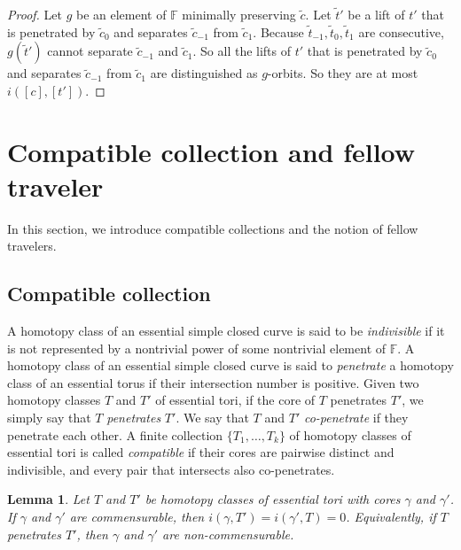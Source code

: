 \documentclass[12pt,a4paper]{amsart}
\numberwithin{equation}{section}
\newcommand{\FF}{\mathbb{F}}
\theoremstyle{plain}
\newtheorem{lemma}[theorem]{Lemma}
\theoremstyle{definition}
\theoremstyle{remark}
\begin{document}
\begin{proof}
    Let $g$ be an element of $\FF$ minimally preserving $\tilde{c}$.
    Let $\tilde{t}'$ be a lift of $t'$ that is penetrated by $\tilde{c}_0$ and separates $\tilde{c}_{-1}$ from $\tilde{c}_1$.
    Because $\tilde{t}_{-1}, \tilde{t}_0, \tilde{t}_1$ are consecutive, $g(\tilde{t}')$ cannot separate $\tilde{c}_{-1}$ and $\tilde{c}_1$.
    So all the lifts of $t'$ that is penetrated by $\tilde{c}_0$ and separates $\tilde{c}_{-1}$ from $\tilde{c}_1$ are distinguished as $g$-orbits.
    So they are at most $i([c], [t'])$.
\end{proof}







\section{Compatible collection and fellow traveler}





In this section, we introduce compatible collections and the notion of fellow travelers.  

\subsection{Compatible collection}

A homotopy class of an essential simple closed curve is said to be \emph{indivisible} if it is not represented by a nontrivial power of some nontrivial element of $\FF$.
A homotopy class of an essential simple closed curve is said to \emph{penetrate} a homotopy class of an essential torus if their intersection number is positive.
Given two homotopy classes \(T\) and \(T'\) of essential tori, if the core of \(T\) penetrates \(T'\), we simply say that \(T\) \emph{penetrates} \(T'\).
We say that \(T\) and \(T'\) \emph{co-penetrate} if they penetrate each other.
A finite collection \(\{T_1, \dots, T_k\}\) of homotopy classes of essential tori is called \emph{compatible} if their cores are pairwise distinct and indivisible, and every pair that intersects also co-penetrates.

\begin{lemma} \label{lem:penetration_noncomm}
    Let $T$ and $T'$ be homotopy classes of essential tori with cores $\gamma$ and $\gamma'$.
    If $\gamma$ and $\gamma'$ are commensurable, then $i(\gamma, T') = i(\gamma', T) = 0$.
    Equivalently, if $T$ penetrates $T'$, then $\gamma$ and $\gamma'$ are non-commensurable.
\end{lemma}
\end{document}
